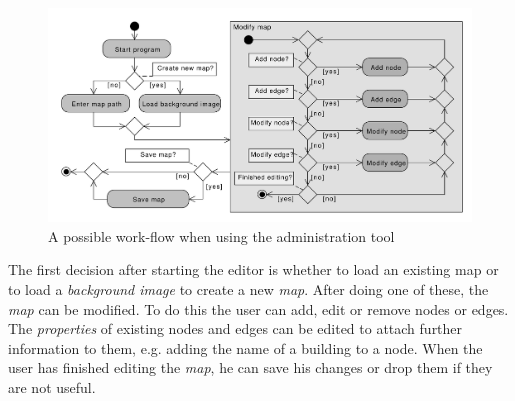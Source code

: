 \begin{figure}[h]
	\centering
	\includegraphics[scale=0.5]{diagrams/activity_admin.pdf}
	\caption{A possible work-flow when using the administration tool}
\end{figure}

The first decision after starting the editor is whether to load an existing map or to load a \textit{background image} to create a new \textit{map}. After doing one of these, the \textit{map} can be modified. To do this the user can add, edit or remove nodes or edges. The \textit{properties} of existing nodes and edges can be edited to attach further information to them, e.g. adding the name of a building to a node. When the user has finished editing the \textit{map}, he can save his changes or drop them if they are not useful.
